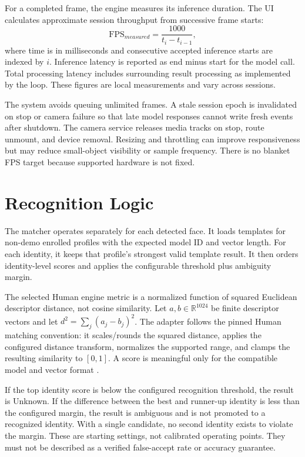 \documentclass[11pt,oneside,openany]{report}
\begin{document}
For a completed frame, the engine measures its inference duration. The UI calculates approximate session throughput from successive frame starts:
\[
  \mathrm{FPS}_{measured} = \frac{1000}{t_i - t_{i-1}},
\]
where time is in milliseconds and consecutive accepted inference starts are indexed by \(i\). Inference latency is reported as end minus start for the model call. Total processing latency includes surrounding result processing as implemented by the loop. These figures are local measurements and vary across sessions.

The system avoids queuing unlimited frames. A stale session epoch is invalidated on stop or camera failure so that late model responses cannot write fresh events after shutdown. The camera service releases media tracks on stop, route unmount, and device removal. Resizing and throttling can improve responsiveness but may reduce small-object visibility or sample frequency. There is no blanket FPS target because supported hardware is not fixed.

\chapter{Recognition Logic}
The matcher operates separately for each detected face. It loads templates for non-demo enrolled profiles with the expected model ID and vector length. For each identity, it keeps that profile's strongest valid template result. It then orders identity-level scores and applies the configurable threshold plus ambiguity margin.

The selected Human engine metric is a normalized function of squared Euclidean descriptor distance, not cosine similarity. Let \(a,b\in\mathbb{R}^{1024}\) be finite descriptor vectors and let \(d^2=\sum_j(a_j-b_j)^2\). The adapter follows the pinned Human matching convention: it scales/rounds the squared distance, applies the configured distance transform, normalizes the supported range, and clamps the resulting similarity to \([0,1]\). A score is meaningful only for the compatible model and vector format \cite{humanEmbedding}.

If the top identity score is below the configured recognition threshold, the result is Unknown. If the difference between the best and runner-up identity is less than the configured margin, the result is ambiguous and is not promoted to a recognized identity. With a single candidate, no second identity exists to violate the margin. These are starting settings, not calibrated operating points. They must not be described as a verified false-accept rate or accuracy guarantee.
\end{document}
